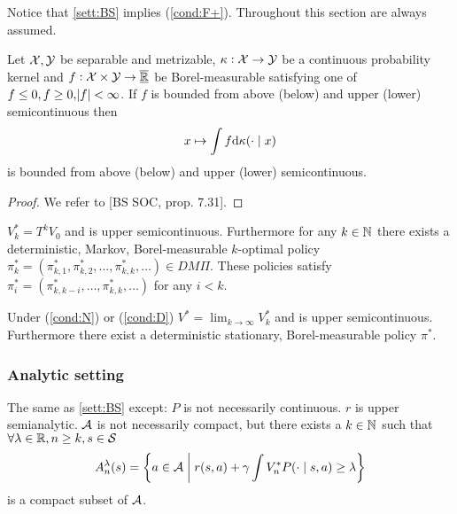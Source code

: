 Notice that \cref{sett:BS} implies (\cref{cond:F+}).
Throughout this section 
are always assumed. 

\begin{prop}
  Let $\mathcal{X}, \mathcal{Y}$ be separable and metrizable,
  $\kappa : \mathcal{X} \to \mathcal{Y}$ be a continuous probability kernel
  and $f:\mathcal{X} \times \mathcal{Y} \to \underline{\overline{\mathbb{R}}}$ be Borel-measurable
  satisfying one of
  $f \leq 0, f \geq 0, \abs{f} < \infty$.
  If $f$ is bounded from above (below) and upper (lower) semicontinuous
  then
  \[ x \mapsto \int f \mathrm{d} \kappa(\cdot \mid x) \]
  is bounded from above (below) and upper (lower) semicontinuous. 
  \label{prop:BS7_31}
\end{prop}
\begin{proof}
  We refer to [BS SOC, prop. 7.31]. %
\end{proof}

\begin{prop}[Prop. 8.6 in BS]
  $V^*_k = T^k V_0$ and is upper semicontinuous.
  Furthermore for any $k \in \mathbb{N}$
  there exists a deterministic, Markov, Borel-measurable $k$-optimal policy
  $\pi^*_k = (\pi^*_{k,1}, \pi^*_{k,2}, \dots, \pi^*_{k,k}, \dots) \in DM\Pi$.
  These policies satisfy
  $\pi^*_{i} = (\pi^*_{k,k-i}, \dots, \pi^*_{k,k}, \dots)$ for any $i < k$.
  \label{prop:BSprop8_6}
\end{prop}

\begin{thm}[Cor. 9.17.2 in BS]
  Under (\cref{cond:N}) or (\cref{cond:D})
  $V^* = \lim_{k\to\infty} V_k^*$ and is upper semicontinuous.
  Furthermore there exist a deterministic
  stationary, Borel-measurable policy $\pi^*$.
  \label{thm:BScor9.17.2}
\end{thm}

\subsubsection{Analytic setting}

\begin{sett}[BS Analytic]
  The same as \cref{sett:BS} except:
  $P$ is not necessarily continuous.
  $r$ is upper semianalytic.
  $\mathcal{A}$ is not necessarily compact, but
  there exists a $k \in \mathbb{N}$ such that
  $\forall \lambda \in \mathbb{R}, n \geq k, s \in \mathcal{S}$
  \[ A^\lambda_n(s) = \left\{ a \in \mathcal{A} \;\middle\vert\; r(s, a)
  + \gamma \int V^*_n P(\cdot \mid s, a) \geq \lambda \right\} \]
  is a compact subset of $\mathcal{A}$.
  \label{sett:BSA}
\end{sett}

